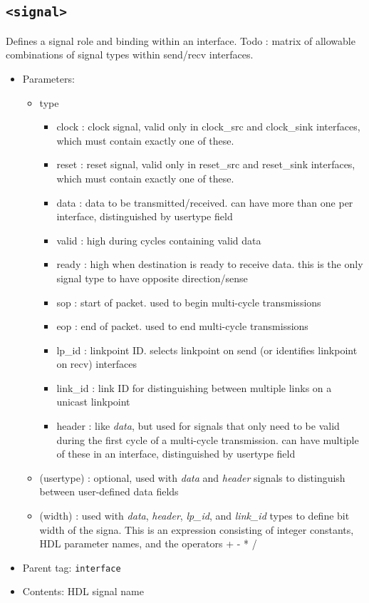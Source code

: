 \documentclass{article}
\begin{document}
\subsection{\texttt{<signal>}}

Defines a signal role and binding within an interface. Todo : matrix of allowable combinations of signal types within send/recv interfaces.

\begin{itemize}
\item{Parameters:}
\begin{itemize}
\item{type}
\begin{itemize}
\item{clock : clock signal, valid only in clock\_src and clock\_sink interfaces, which must contain exactly one of these.}
\item{reset : reset signal, valid only in reset\_src and reset\_sink interfaces, which must contain exactly one of these.}
\item{data : data to be transmitted/received. can have more than one per interface, distinguished by usertype field}
\item{valid : high during cycles containing valid data}
\item{ready : high when destination is ready to receive data. this is the only signal type to have opposite direction/sense} 
\item{sop : start of packet. used to begin multi-cycle transmissions}
\item{eop : end of packet. used to end multi-cycle transmissions}
\item{lp\_id : linkpoint ID. selects linkpoint on send (or identifies linkpoint on recv) interfaces}
\item{link\_id : link ID for distinguishing between multiple links on a unicast linkpoint}
\item{header : like \textit{data}, but used for signals that only need to be valid during the first cycle of a multi-cycle transmission. can have multiple of these in an interface, distinguished by usertype field}
\end{itemize}
\item{(usertype) : optional, used with \textit{data} and \textit{header} signals to distinguish between user-defined data fields}
\item{(width) : used with \textit{data}, \textit{header}, \textit{lp\_id}, and \textit{link\_id} types to define bit width of the signa. This is an expression consisting of integer constants, HDL parameter names, and the operators + - * /}
\end{itemize}
\item{Parent tag: \texttt{interface}}
\item{Contents: HDL signal name}
\end{itemize}
\end{document}
